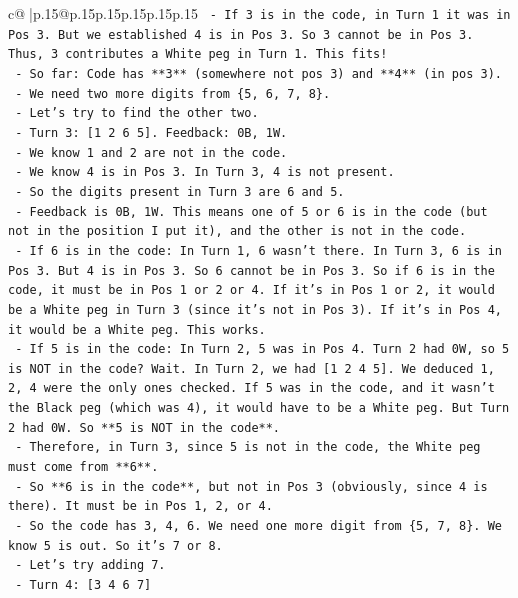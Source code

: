 \documentclass{article}
\begin{document}
{\begin{supertabular}{c@{$\;$}|p{.15\linewidth}@{}p{.15\linewidth}p{.15\linewidth}p{.15\linewidth}p{.15\linewidth}p{.15\linewidth}}
{{{\texttt{        {-} If 3 is in the code, in Turn 1 it was in Pos 3. But we established 4 is in Pos 3. So 3 cannot be in Pos 3. Thus, 3 contributes a White peg in Turn 1. This fits!} \\
\texttt{        {-} So far: Code has **3** (somewhere not pos 3) and **4** (in pos 3).} \\
\texttt{        {-} We need two more digits from \{5, 6, 7, 8\}.} \\
\texttt{        {-} Let's try to find the other two.} \\
\texttt{        {-} Turn 3: {[}1 2 6 5{]}. Feedback: 0B, 1W.} \\
\texttt{          {-} We know 1 and 2 are not in the code.} \\
\texttt{          {-} We know 4 is in Pos 3. In Turn 3, 4 is not present.} \\
\texttt{          {-} So the digits present in Turn 3 are 6 and 5.} \\
\texttt{          {-} Feedback is 0B, 1W. This means one of 5 or 6 is in the code (but not in the position I put it), and the other is not in the code.} \\
\texttt{          {-} If 6 is in the code: In Turn 1, 6 wasn't there. In Turn 3, 6 is in Pos 3. But 4 is in Pos 3. So 6 cannot be in Pos 3. So if 6 is in the code, it must be in Pos 1 or 2 or 4. If it's in Pos 1 or 2, it would be a White peg in Turn 3 (since it's not in Pos 3). If it's in Pos 4, it would be a White peg. This works.} \\
\texttt{          {-} If 5 is in the code: In Turn 2, 5 was in Pos 4. Turn 2 had 0W, so 5 is NOT in the code? Wait. In Turn 2, we had {[}1 2 4 5{]}. We deduced 1, 2, 4 were the only ones checked. If 5 was in the code, and it wasn't the Black peg (which was 4), it would have to be a White peg. But Turn 2 had 0W. So **5 is NOT in the code**.} \\
\texttt{          {-} Therefore, in Turn 3, since 5 is not in the code, the White peg must come from **6**.} \\
\texttt{          {-} So **6 is in the code**, but not in Pos 3 (obviously, since 4 is there). It must be in Pos 1, 2, or 4.} \\
\texttt{          {-} So the code has 3, 4, 6. We need one more digit from \{5, 7, 8\}. We know 5 is out. So it's 7 or 8.} \\
\texttt{          {-} Let's try adding 7.} \\
\texttt{          {-} Turn 4: {[}3 4 6 7{]}} \\
}}}
\end{supertabular}}
\end{document}
